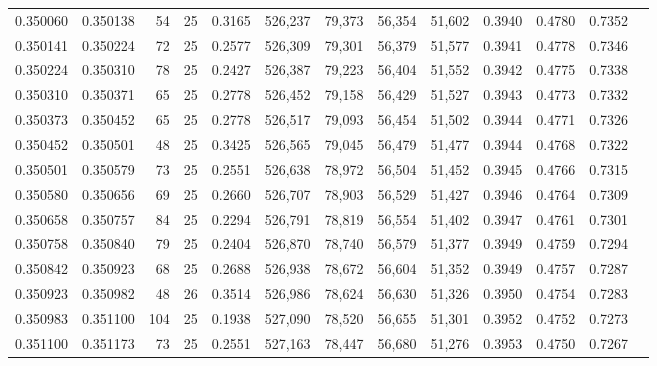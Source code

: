 \begin{tabular}{rrrrrrrrrrrrr}
0.350060 & 0.350138 &    54 &  25 &                                     0.3165 & 526,237 &  79,373 &  56,354 &  51,602 & 0.3940 & 0.4780 & 0.7352 \\
0.350141 & 0.350224 &    72 &  25 &                                     0.2577 & 526,309 &  79,301 &  56,379 &  51,577 & 0.3941 & 0.4778 & 0.7346 \\
0.350224 & 0.350310 &    78 &  25 &                                     0.2427 & 526,387 &  79,223 &  56,404 &  51,552 & 0.3942 & 0.4775 & 0.7338 \\
0.350310 & 0.350371 &    65 &  25 &                                     0.2778 & 526,452 &  79,158 &  56,429 &  51,527 & 0.3943 & 0.4773 & 0.7332 \\
0.350373 & 0.350452 &    65 &  25 &                                     0.2778 & 526,517 &  79,093 &  56,454 &  51,502 & 0.3944 & 0.4771 & 0.7326 \\
0.350452 & 0.350501 &    48 &  25 &                                     0.3425 & 526,565 &  79,045 &  56,479 &  51,477 & 0.3944 & 0.4768 & 0.7322 \\
0.350501 & 0.350579 &    73 &  25 &                                     0.2551 & 526,638 &  78,972 &  56,504 &  51,452 & 0.3945 & 0.4766 & 0.7315 \\
0.350580 & 0.350656 &    69 &  25 &                                     0.2660 & 526,707 &  78,903 &  56,529 &  51,427 & 0.3946 & 0.4764 & 0.7309 \\
0.350658 & 0.350757 &    84 &  25 &                                     0.2294 & 526,791 &  78,819 &  56,554 &  51,402 & 0.3947 & 0.4761 & 0.7301 \\
0.350758 & 0.350840 &    79 &  25 &                                     0.2404 & 526,870 &  78,740 &  56,579 &  51,377 & 0.3949 & 0.4759 & 0.7294 \\
0.350842 & 0.350923 &    68 &  25 &                                     0.2688 & 526,938 &  78,672 &  56,604 &  51,352 & 0.3949 & 0.4757 & 0.7287 \\
0.350923 & 0.350982 &    48 &  26 &                                     0.3514 & 526,986 &  78,624 &  56,630 &  51,326 & 0.3950 & 0.4754 & 0.7283 \\
0.350983 & 0.351100 &   104 &  25 &                                     0.1938 & 527,090 &  78,520 &  56,655 &  51,301 & 0.3952 & 0.4752 & 0.7273 \\
0.351100 & 0.351173 &    73 &  25 &                                     0.2551 & 527,163 &  78,447 &  56,680 &  51,276 & 0.3953 & 0.4750 & 0.7267 \\

\end{tabular}
